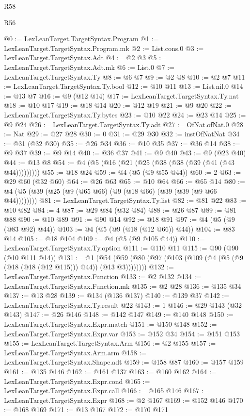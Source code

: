 \begin{lexlean}{R58}
\begin{lexlean}{R56}
\begin{coremodule}
{{{{{{{{{{{{{{{{{{{{{{{{{{{{{{{{{{{{{{{{{{{{{{{{{{{{{{{{{{{{{{{{{{{{{{{{{{{{{{{{{{{{{{{{{{{{{{{{{{{{{{{{{{{{{{{{{{{{{{{{{{{{{{{{{{{{{{{{{{{{{{{{{{{{{{{{{{{{{{{{{{{{{{{{{{{{{{{{{{{{{{{{{{{{{{{{{{{{{{{{{{{{{{{{{{{@0 := LexLeanTarget.TargetSyntax.Program
@1 := LexLeanTarget.TargetSyntax.Program.mk
@2 := List.cons.{0}
@3 := LexLeanTarget.TargetSyntax.Adt
@4 := @2 @3
@5 := LexLeanTarget.TargetSyntax.Adt.mk
@6 := List.{0}
@7 := LexLeanTarget.TargetSyntax.Ty
@8 := @6 @7
@9 := @2 @8
@10 := @2 @7
@11 := LexLeanTarget.TargetSyntax.Ty.bool
@12 := @10 @11
@13 := List.nil.{0}
@14 := @13 @7
@16 := @9 (@12 @14)
@17 := LexLeanTarget.TargetSyntax.Ty.nat
@18 := @10 @17
@19 := @18 @14
@20 := @12 @19
@21 := @9 @20
@22 := LexLeanTarget.TargetSyntax.Ty.bytes
@23 := @10 @22
@24 := @23 @14
@25 := @9 @24
@26 := LexLeanTarget.TargetSyntax.Ty.adt
@27 := OfNat.ofNat.{0}
@28 := Nat
@29 := @27 @28
@30 := 0
@31 := @29 @30
@32 := instOfNatNat
@34 := @31 (@32 @30)
@35 := @26 @34
@36 := @10 @35
@37 := @36 @14
@38 := @9 @37
@39 := @9 @14
@40 := @36 @37
@41 := @9 @40
@43 := @9 (@23 @40)
@44 := @13 @8
@54 := @4 (@5 (@16 (@21 (@25 (@38 (@38 (@39 (@41 (@43 @44)))))))))
@55 := @18 @24
@59 := @4 (@5 (@9 @55 @44))
@60 := 2
@63 := @29 @60 (@32 @60)
@64 := @26 @63
@65 := @10 @64
@66 := @65 @14
@80 := @4 (@5 (@39 (@25 (@9 (@65 @66) (@9 (@18 @66) (@39 (@39 (@9 @66 @44))))))))
@81 := LexLeanTarget.TargetSyntax.Ty.list
@82 := @81 @22
@83 := @10 @82
@84 := 4
@87 := @29 @84 (@32 @84)
@88 := @26 @87
@89 := @81 @88
@90 := @10 @89
@91 := @90 @14
@92 := @18 @91
@97 := @4 (@5 (@9 (@83 @92) @44))
@103 := @4 (@5 (@9 (@18 (@12 @66)) @44))
@104 := @83 @14
@105 := @18 @104
@109 := @4 (@5 (@9 @105 @44))
@110 := LexLeanTarget.TargetSyntax.Ty.option
@111 := @110 @11
@115 := @90 (@90 (@10 @111 @14))
@131 := @1 (@54 (@59 (@80 (@97 (@103 (@109 (@4 (@5 (@9 (@18 (@18 (@12 @115))) @44)) (@13 @3))))))))
@132 := LexLeanTarget.TargetSyntax.Function
@133 := @2 @132
@134 := LexLeanTarget.TargetSyntax.Function.mk
@135 := @2 @28
@136 := @135 @34
@137 := @13 @28
@139 := @134 (@136 @137)
@140 := @139 @37
@142 := LexLeanTarget.TargetSyntax.Ty.result @22
@143 := 1
@146 := @29 @143 (@32 @143)
@147 := @26 @146
@148 := @142 @147
@149 := @140 @148
@150 := LexLeanTarget.TargetSyntax.Expr.match
@151 := @150 @148
@152 := LexLeanTarget.TargetSyntax.Expr.var
@153 := @152 @34
@154 := @151 @153
@155 := LexLeanTarget.TargetSyntax.Arm
@156 := @2 @155
@157 := LexLeanTarget.TargetSyntax.Arm.arm
@158 := LexLeanTarget.TargetSyntax.Shape.adt
@159 := @158 @87
@160 := @157 @159
@161 := @135 @146
@162 := @161 @137
@163 := @160 @162
@164 := LexLeanTarget.TargetSyntax.Expr.cond
@165 := LexLeanTarget.TargetSyntax.Expr.call
@166 := @165 @146
@167 := LexLeanTarget.TargetSyntax.Expr
@168 := @2 @167
@169 := @152 @146
@170 := @168 @169
@171 := @13 @167
@172 := @170 @171
}}}}}}}}}}}}}}}}}}}}}}}}}}}}}}}}}}}}}}}}}}}}}}}}}}}}}}}}}}}}}}}}}}}}}}}}}}}}}}}}}}}}}}}}}}}}}}}}}}}}}}}}}}}}}}}}}}}}}}}}}}}}}}}}}}}}}}}}}}}}}}}}}}}}}}}}}}}}}}}}}}}}}}}}}}}}}}}}}}}}}}}}}}}}}}}}}}}}}}}}}}}}}}}}}}}
\end{coremodule}
\end{lexlean}
\end{lexlean}
